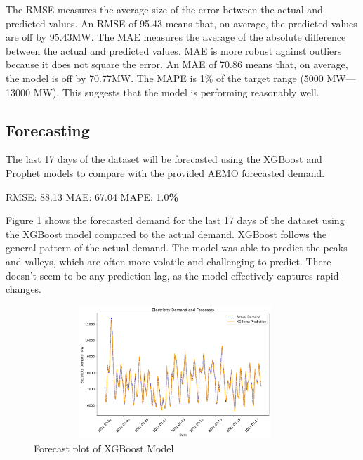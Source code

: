 \documentclass[mstat,12pt]{unswthesis}
\newenvironment{Shaded}{\begin{snugshade}}{\end{snugshade}}
\newcommand{\FloatTok}[1]{\textcolor[rgb]{0.00,0.00,0.81}{#1}}
\newcommand{\NormalTok}[1]{#1}
\newcommand{\OperatorTok}[1]{\textcolor[rgb]{0.81,0.36,0.00}{\textbf{#1}}}
\begin{document}
The RMSE measures the average size of the error between the actual and
predicted values. An RMSE of 95.43 means that, on average, the predicted
values are off by 95.43MW. The MAE measures the average of the absolute
difference between the actual and predicted values. MAE is more robust
against outliers because it does not square the error. An MAE of 70.86
means that, on average, the model is off by 70.77MW. The MAPE is 1\% of
the target range (5000 MW---13000 MW). This suggests that the model is
performing reasonably well.

\subsection{Forecasting}\label{forecasting}

The last 17 days of the dataset will be forecasted using the XGBoost and
Prophet models to compare with the provided AEMO forecasted demand.

\begin{Shaded}
\begin{Highlighting}[]
\NormalTok{RMSE: }\FloatTok{88.13}
\NormalTok{MAE: }\FloatTok{67.04}
\NormalTok{MAPE: }\FloatTok{1.0}\OperatorTok{\%}
\end{Highlighting}
\end{Shaded}

Figure \ref{xgboost_prediction} shows the forecasted demand for the last
17 days of the dataset using the XGBoost model compared to the actual
demand. XGBoost follows the general pattern of the actual demand. The
model was able to predict the peaks and valleys, which are often more
volatile and challenging to predict. There doesn't seem to be any
prediction lag, as the model effectively captures rapid changes.

\begin{figure}[H]
\centering
\includegraphics[width=0.95\textwidth, height=5cm]{xgboost_prediction.png}
\caption{Forecast plot of XGBoost Model}\label{xgboost_prediction}
\end{figure}
\end{document}
